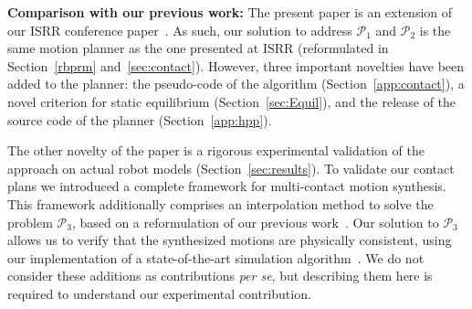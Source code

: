 \documentclass[journal]{IEEEtran}
\providecommand{\DIFaddtex}[1]{#1} %
\providecommand{\DIFdeltex}[1]{} %
\providecommand{\DIFaddbegin}{\protect\color{blue}} %
\providecommand{\DIFaddend}{\protect\color{black}} %
\providecommand{\DIFdelbegin}{\protect\cbdelete} %
\providecommand{\DIFdelend}{} %
\providecommand{\DIFadd}[1]{\texorpdfstring{\DIFaddtex{#1}}{#1}} %
\providecommand{\DIFdel}[1]{\texorpdfstring{\DIFdeltex{#1}}{}} %
\begin{document}
\DIFdelbegin \DIFdel{The paper extends our previous papers presenting the reachability condition~\cite{tonneauisrr15}and the connection of our contact planner with a solver~$\mathcal{P}_3$~\cite{Carpentier2016}}\DIFdelend \DIFaddbegin \noindent \DIFadd{\textbf{Comparison with our previous work:}
The present paper is an extension of our ISRR conference paper~\cite{tonneauisrr15}. 
As such, our solution to address $\mathcal{P}_1$ and $\mathcal{P}_2$ is the same motion planner as the one presented at ISRR (reformulated in Section~\ref{rbprm} and~\ref{sec:contact})}\DIFaddend . 
\DIFdelbegin \DIFdel{we introduce a new efficient criterion of the robot balance, provide the complete }\DIFdelend \DIFaddbegin \DIFadd{However, three important novelties have been added to the planner: the }\DIFaddend pseudo-code \DIFdelbegin \DIFdel{and release our source code that can be used to directly reproduce our results. We also provide a }\DIFdelend \DIFaddbegin \DIFadd{of the algorithm  (Section~\ref{app:contact}), a novel criterion for
static equilibrium (Section~\ref{sec:Equil}), and the release of the source code of the planner (Section~\ref{app:hpp}).
}

\DIFadd{The other novelty of the paper is a rigorous experimental validation of the approach on actual robot models (Section~\ref{sec:results}).
To validate our contact plans we introduced a complete framework for multi-contact motion synthesis. This framework additionally comprises an interpolation method to solve the problem $\mathcal{P}_3$,  based on a reformulation of our previous work~\cite{Carpentier2016}. Our }\DIFaddend solution to $\mathcal{P}_3$ \DIFdelbegin \DIFdel{.
The planner is validated on robot models of HyQ and HRP-2 (while \cite{tonneauisrr15} used unrealistic avatar models) with complete performance analysis.
}\DIFdelend \DIFaddbegin \DIFadd{allows us to verify that the synthesized motions are physically consistent, using our implementation of a state-of-the-art simulation algorithm~\cite{Kaufman2008}. 
We do not consider these additions as contributions \textit{per se}, but describing them here is required to understand our experimental contribution.
}\DIFaddend 
\end{document}
